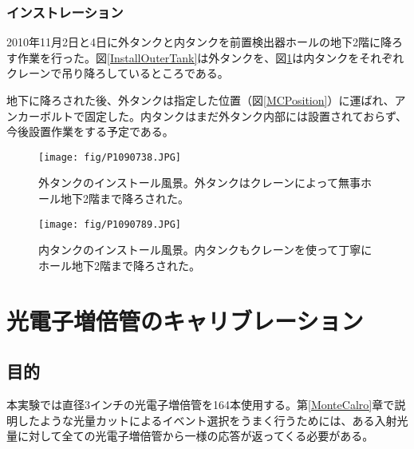 \documentclass[11pt]{jreport}
\newcommand{\figref}[1]{図\ref{#1}}
\newcommand{\secref}[1]{第\ref{#1}章}
\begin{document}
\subsection{インストレーション}
2010年11月2日と4日に外タンクと内タンクを前置検出器ホールの地下2階に降ろす作業を行った。\figref{InstallOuterTank}は外タンクを、\figref{InstallInnerTank}は内タンクをそれぞれクレーンで吊り降ろしているところである。

地下に降ろされた後、外タンクは指定した位置（\figref{MCPosition}）に運ばれ、アンカーボルトで固定した。内タンクはまだ外タンク内部には設置されておらず、今後設置作業をする予定である。

\begin{figure}[htbp]
\begin{minipage}{0.47\textwidth}
\centering
\texttt{[image: fig/P1090738.JPG]}
\caption[外タンクインストール風景]{外タンクのインストール風景。外タンクはクレーンによって無事ホール地下2階まで降ろされた。}
\label{InstallOuterTank}
\end{minipage}
\hfil
\begin{minipage}{0.47\textwidth}
\centering
\texttt{[image: fig/P1090789.JPG]}
\caption[内タンクインストール風景]{内タンクのインストール風景。内タンクもクレーンを使って丁寧にホール地下2階まで降ろされた。}
\label{InstallInnerTank}
\end{minipage}
\end{figure}








\chapter{光電子増倍管のキャリブレーション}
\label{PMTCalibration}
\section{目的}
本実験では直径3インチの光電子増倍管を164本使用する。\secref{MonteCalro}で説明したような光量カットによるイベント選択をうまく行うためには、ある入射光量に対して全ての光電子増倍管から一様の応答が返ってくる必要がある。
\end{document}
